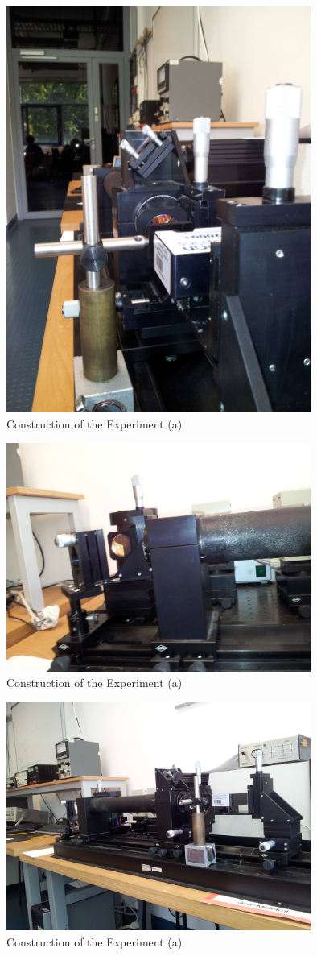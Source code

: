 \begin{figure}
\includegraphics[width=10cm]{pics/const3}
\caption{Construction of the Experiment (a)}
\label{fig:const3}
\end{figure}
\begin{figure}
\includegraphics[width=10cm]{pics/const4}
\caption{Construction of the Experiment (a)}
\label{fig:const4}
\end{figure}
\begin{figure}
\includegraphics[width=10cm]{pics/const_overview}
\caption{Construction of the Experiment (a)}
\label{fig:const_overview}
\end{figure}

